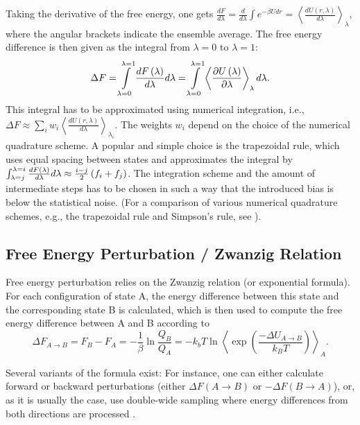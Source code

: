 Taking the derivative of the free energy, one gets $\frac{dF}{d\lambda}=\frac{d}{d\lambda}\int e^{-\beta U dr}=\left\langle \frac{dU\left(r,\lambda\right)}{d\lambda}\right\rangle _{\lambda}$\cite{Shirts.2013}, 
where the angular brackets indicate the ensemble average.
The free energy difference is then given as the integral from $\lambda=0$ to $\lambda=1$:
\[
\Delta F=
\intop_{\lambda=0}^{\lambda=1}\frac{dF\left(\lambda\right)}{d\lambda}d\lambda=
\intop_{\lambda=0}^{\lambda=1}\left\langle\frac{\partial U\left(\lambda\right)}{\partial\lambda}\right\rangle_\lambda d\lambda
.
\]
This integral has to be approximated using numerical integration, i.e., $\Delta F\approx\sum_{i}w_{i}\left\langle \frac{dU\left(r,\lambda\right)}{d\lambda}\right\rangle _{\lambda_{i}}$.
The weights $w_{i}$ depend on the choice of the numerical quadrature scheme.
A popular and simple choice is the trapezoidal rule, which uses equal
spacing between states and approximates the integral by $\intop_{\lambda=j}^{\lambda=i}\frac{dF\left(\lambda\right)}{d\lambda}d\lambda\approx\frac{i-j}{2}\left(f_{i}+f_{j}\right)$.
The integration scheme and the amount of intermediate steps has to
be chosen in such a way that the introduced bias is below the statistical
noise\cite{Shirts.2013}. (For a comparison of various numerical quadrature
schemes, e.g., the trapezoidal rule and Simpson's rule, see \cite{Bruckner.2011b}). 

\subsection{Free Energy Perturbation / Zwanzig Relation}

Free energy perturbation relies on the Zwanzig relation (or exponential
formula). For each configuration of state A, the energy difference
between this state and the corresponding state B is calculated, which is then used to compute the free energy difference between A and B according to \cite{Gapsys.2015}
\[
\Delta F_{A\rightarrow B}=F_{B}-F_{A}=-\frac{1}{\beta}\ln\frac{Q_{B}}{Q_{A}}=-k_{b}T\ln\left\langle \exp\left(\frac{-\Delta U_{A\rightarrow B}}{k_{B}T}\right)\right\rangle _{A}.
\]

Several variants of the formula exist: For instance, one can either
calculate forward or backward perturbations (either $\Delta F\left(A\rightarrow B\right)$ or
$-\Delta F\left(B\rightarrow A\right)$), or, as it is
usually the case, use double-wide sampling where energy differences
from both directions are processed \cite{Bruckner.2011}.

